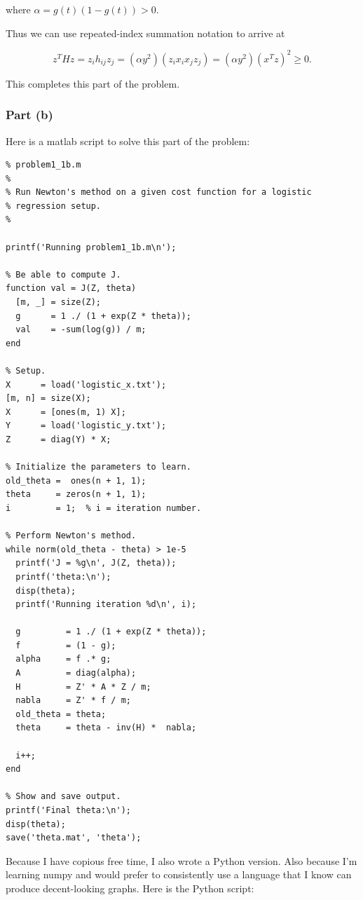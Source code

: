 \documentclass[]{article}
\begin{document}
where \(\alpha = g(t)(1-g(t)) > 0.\)

Thus we can use repeated-index summation notation to arrive at

\[z^THz = z_ih_{ij}z_j = (\alpha y^2)(z_ix_ix_jz_j)
        = (\alpha y^2)(x^Tz)^2 \ge 0.\]

This completes this part of the problem.

\subsubsection{Part (b)}\label{part-b}

Here is a matlab script to solve this part of the problem:

\begin{verbatim}
% problem1_1b.m
%
% Run Newton's method on a given cost function for a logistic
% regression setup.
%

printf('Running problem1_1b.m\n');

% Be able to compute J.
function val = J(Z, theta)
  [m, _] = size(Z);
  g      = 1 ./ (1 + exp(Z * theta));
  val    = -sum(log(g)) / m;
end

% Setup.
X      = load('logistic_x.txt');
[m, n] = size(X);
X      = [ones(m, 1) X];
Y      = load('logistic_y.txt');
Z      = diag(Y) * X;

% Initialize the parameters to learn.
old_theta =  ones(n + 1, 1);
theta     = zeros(n + 1, 1);
i         = 1;  % i = iteration number.

% Perform Newton's method.
while norm(old_theta - theta) > 1e-5
  printf('J = %g\n', J(Z, theta));
  printf('theta:\n');
  disp(theta);
  printf('Running iteration %d\n', i);

  g         = 1 ./ (1 + exp(Z * theta));
  f         = (1 - g);
  alpha     = f .* g;
  A         = diag(alpha);
  H         = Z' * A * Z / m;
  nabla     = Z' * f / m;
  old_theta = theta;
  theta     = theta - inv(H) *  nabla;

  i++;
end

% Show and save output.
printf('Final theta:\n');
disp(theta);
save('theta.mat', 'theta');
\end{verbatim}

Because I have copious free time, I also wrote a Python version. Also
because I'm learning numpy and would prefer to consistently use a
language that I know can produce decent-looking graphs. Here is the
Python script:
\end{document}
